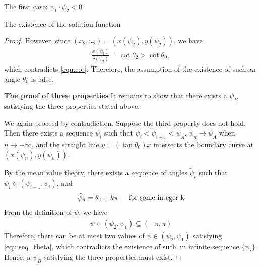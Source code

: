 \documentclass[letterpaper,reqno,10pt,twoside]{amsart}
\theoremstyle{definition}
\theoremstyle{remark}
\begin{document}
\begin{section}{The first case: $\psi_1\cdot \psi_2<0$ }
\begin{subsection}{The existence of the solution function}
\begin{proof}
  However, since $(x_{2},u_{2})=(x(\psi_{2}),y(\psi_{2}))$, we have
  \begin{align}
      \frac{x(\psi_{2})}{y(\psi_{2})}=\cot \theta_{2}>\cot \theta_{0}, 
  \end{align}
  \noindent which contradicts \eqref{equ:cot}. Therefore, the assumption of the existence of such an angle $\theta_{0}$ is false.

  \textbf{The proof of three properties} It remains to show that there exists a $\psi_{B}$ satisfying the three properties stated above. 

  We again proceed by contradiction. Suppose the third property does not hold. Then there exists a sequence $\psi_{i}$ such that $\psi_{i}<\psi_{i+1}<\psi_{A}$, $\psi_{n}\rightarrow \psi_{A}$ when $n\rightarrow +\infty$, and the straight line $y=(\tan\theta_{0})x$ intersects the boundary curve at $(x(\psi_{n}),y(\psi_{n}))$. 
  
  By the mean value theory, there exists a sequence of angles $\tilde{\psi}_{i}$ such that $\tilde{\psi}_{i}\in(\psi_{i-1},\psi_{i})$, and
  \begin{align}{\label{equ:seq_theta}}
  \tilde{\psi}_{n}=\theta_{0}+k\pi~~~~\operatorname{for~some~integer~k}
  \end{align}
  From the definition of $\psi$, we have
  \begin{align}
      \psi\in(\psi_{2},\psi_{1})\subseteq (-\pi,\pi)
  \end{align}
  \noindent Therefore, there can be at most two values of $\psi\in(\psi_{2},\psi_{1})$ satisfying \eqref{equ:seq_theta}, which contradicts the existence of such an infinite sequence $\{\psi_{i}\}$. Hence, a $\psi_{B}$ satisfying the three properties must exist.
  \end{proof}
  
    \end{subsection}
    \end{section}
\end{document}
